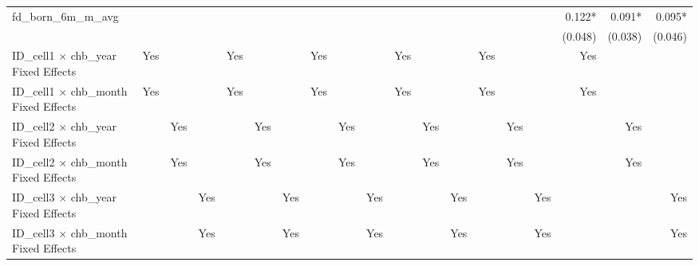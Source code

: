 \begin{tabular}{lrrrrrrrrrrrrrrrrrr}
fd\_born\_6m\_m\_avg                        &             &             &             &             &             &             &             &             &             &             &             &             &             &             &             &      0.122* &      0.091* &      0.095* \\ 
                                            &             &             &             &             &             &             &             &             &             &             &             &             &             &             &             &     (0.048) &     (0.038) &     (0.046) \\ 
\midrule
ID\_cell1 $\times$ chb\_year Fixed Effects  &         Yes &             &             &         Yes &             &             &         Yes &             &             &         Yes &             &             &         Yes &             &             &         Yes &             &             \\ 
ID\_cell1 $\times$ chb\_month Fixed Effects &         Yes &             &             &         Yes &             &             &         Yes &             &             &         Yes &             &             &         Yes &             &             &         Yes &             &             \\ 
ID\_cell2 $\times$ chb\_year Fixed Effects  &             &         Yes &             &             &         Yes &             &             &         Yes &             &             &         Yes &             &             &         Yes &             &             &         Yes &             \\ 
ID\_cell2 $\times$ chb\_month Fixed Effects &             &         Yes &             &             &         Yes &             &             &         Yes &             &             &         Yes &             &             &         Yes &             &             &         Yes &             \\ 
ID\_cell3 $\times$ chb\_year Fixed Effects  &             &             &         Yes &             &             &         Yes &             &             &         Yes &             &             &         Yes &             &             &         Yes &             &             &         Yes \\ 
ID\_cell3 $\times$ chb\_month Fixed Effects &             &             &         Yes &             &             &         Yes &             &             &         Yes &             &             &         Yes &             &             &         Yes &             &             &         Yes \\ 

\end{tabular}
